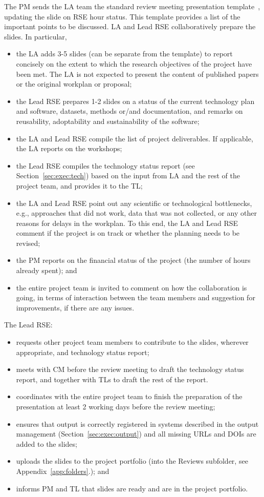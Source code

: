 The PM sends the LA team the standard review meeting presentation template~\cite{proj-templates}, updating the slide on RSE hour status. This
template provides a list of the important points to be discussed. LA and Lead RSE collaboratively prepare the slides.
In particular, 
\begin{itemize}
\item the LA adds 3-5 slides (can be separate from the template) to report concisely on the extent to which the research
objectives of the project have been met. The LA is not expected to present the content of published papers or the
original workplan or proposal;
\item the Lead RSE prepares 1-2 slides on a status of the current technology plan and software, datasets, methods or/and documentation, 
  and remarks on reusability, adoptability and sustainability of the software;
\item the LA and Lead RSE compile the list of project deliverables. If applicable, the LA reports on the workshops;
\item the Lead RSE compiles the technology status report (see Section~\ref{sec:exec:tech}) based on the input from LA and
the rest of the project team, and provides it to the TL;
\item the LA and Lead RSE point out any scientific or technological bottlenecks, e.g., approaches that did not work, data that
was not collected, or any other reasons for delays in the workplan. To this end, the LA and Lead RSE comment if the
project is on track or whether the planning needs to be revised;
\item the PM reports on the financial status of the project (the number of hours already spent); and
\item the entire project team is invited to comment on how the collaboration is going, in terms of interaction between the
team members and suggestion for improvements, if there are any issues.
\end{itemize}


The Lead RSE:
\begin{itemize}
\item requests other project team members to contribute to the slides, wherever appropriate, and technology status report;
\item meets with CM before the review meeting to draft the technology status report, and together with TLs to draft the rest
of the report.
\item coordinates with the entire project team to finish the preparation of the presentation at least 2 working days before
the review meeting;
\item ensures that output is correctly registered in systems described in the output management (Section~\ref{sec:exec:output}) 
  and all missing URLs and DOIs are added to the slides;
\item uploads the slides to the project portfolio (into the Reviews subfolder, see Appendix~\ref{app:folders}.); and
\item informs PM and TL that slides are ready and are in the project portfolio.
\end{itemize}

